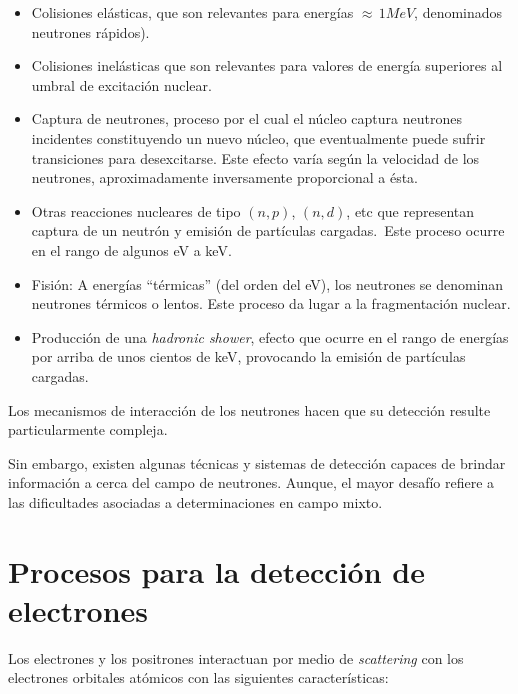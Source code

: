 \begin{itemize}
 \item Colisiones el\'asticas, que son relevantes para energ\'ias $\approx \, 1 MeV$,  denominados neutrones r\'apidos).
 \item Colisiones inel\'asticas que son relevantes para valores de energ\'ia superiores al umbral de excitaci\'on nuclear.
 \item Captura de neutrones, proceso por el cual el n\'ucleo captura neutrones incidentes constituyendo un nuevo n\'ucleo, que eventualmente
 puede sufrir transiciones para desexcitarse. Este efecto var\'ia seg\'un la velocidad de los neutrones, aproximadamente inversamente 
 proporcional a \'esta.
 \item Otras reacciones nucleares de tipo $(n,p)$, $(n,d)$, etc que representan captura de un neutr\'on y emisi\'on de part\'iculas cargadas.\,
 Este proceso ocurre en el rango de algunos eV a keV.
 \item Fisi\'on: A energ\'ias ``t\'ermicas'' (del orden del eV), los neutrones se denominan neutrones t\'ermicos o lentos. Este proceso da 
 lugar a la fragmentaci\'on nuclear.
 \item Producci\'on de una \textit{hadronic shower}, efecto que ocurre en el rango de energ\'ias por arriba de unos cientos de keV,
 provocando la emisi\'on de part\'iculas cargadas.
\end{itemize}

Los mecanismos de interacci\'on de los neutrones hacen que su detecci\'on resulte particularmente compleja.
%

%
Sin embargo, existen algunas t\'ecnicas y sistemas de detecci\'on capaces de brindar informaci\'on a cerca del campo de neutrones. 
%
Aunque, el mayor desaf\'io refiere a las dificultades asociadas a determinaciones en campo mixto.

\section{Procesos para la detecci\'on de electrones}
\label{CapIII_3}


Los electrones y los positrones interactuan por medio de \textit{scattering} con los electrones orbitales at\'omicos con las siguientes 
caracter\'isticas:


